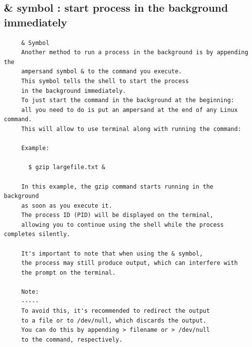 \documentclass[a4paper,12pt]{article}
\begin{document}
\subsection{\& symbol   : start process in the background immediately  }
\begin{verbatim}
     & Symbol
     Another method to run a process in the background is by appending the
     ampersand symbol & to the command you execute. 
     This symbol tells the shell to start the process
     in the background immediately. 
     To just start the command in the background at the beginning: 
     all you need to do is put an ampersand at the end of any Linux command.
     This will allow to use terminal along with running the command:

     Example:

       $ gzip largefile.txt &

     In this example, the gzip command starts running in the background 
     as soon as you execute it. 
     The process ID (PID) will be displayed on the terminal, 
     allowing you to continue using the shell while the process completes silently.

     It's important to note that when using the & symbol, 
     the process may still produce output, which can interfere with
     the prompt on the terminal. 
     
     Note: 
     -----
     To avoid this, it's recommended to redirect the output
     to a file or to /dev/null, which discards the output. 
     You can do this by appending > filename or > /dev/null
     to the command, respectively.
\end{verbatim}
\end{document}
